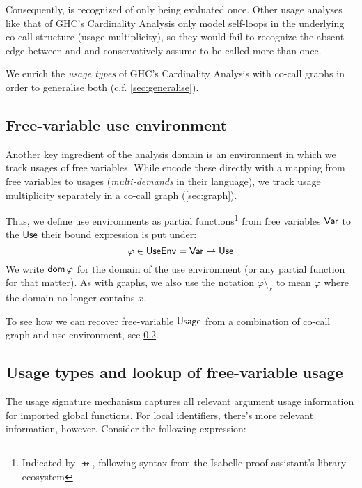 Consequently,  is recognized of only being evaluated once. 
Other usage analyses like that of GHC's Cardinality Analysis \parencite{card} only model self-loops in the underlying co-call structure (\eg usage multiplicity), so they would fail to recognize the absent edge between  and  and conservatively assume  to be called more than once.


We enrich the \emph{usage types} of GHC's Cardinality Analysis \parencite{card} with co-call graphs in order to generalise both (c.f. \cref{sec:generalise}).

\subsection{Free-variable use environment}\label{sec:useenv}

Another key ingredient of the analysis domain is an environment in which we track usages of free variables.
While \textcite{card} encode these directly with a mapping from free variables to usages (\emph{multi-demands} in their language), we track usage multiplicity separately in a co-call graph (\cref{sec:graph}).

Thus, we define use environments as partial functions\footnote{Indicated by $\pfun$, following syntax from the Isabelle proof assistant's library ecosystem} from free variables $\text{\textsf{Var}}$ to the $\text{\textsf{Use}}$ their bound expression is put under:
\[
\varphi \in \text{\textsf{UseEnv}} = \text{\textsf{Var}} \rightharpoonup \text{\textsf{Use}}
\]
We write $\mathsf{dom}\,\varphi$ for the domain of the use environment (or any partial function for that matter).
As with graphs, we also use the notation $\varphi \setminus_x$ to mean $\varphi$ where the domain no longer contains $x$.

To see how we can recover free-variable $\text{\textsf{Usage}}$ from a combination of co-call graph and use environment, see \cref{sec:utype}.

\subsection{Usage types and lookup of free-variable usage}\label{sec:utype}

The usage signature mechanism captures all relevant argument usage information for imported global functions.
For local identifiers, there's more relevant information, however.
Consider the following expression:

